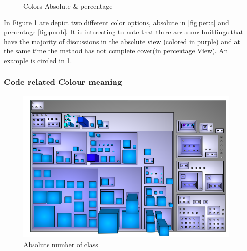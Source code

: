 \documentclass[]{usiinfbachelorproject}
\begin{document}
\begin{figure}[h]
\centering
{}
\hspace*{\fill}

\caption{Colors Absolute \& percentage}
\label{fig:per}
\end{figure}
In Figure \ref{fig:per} are depict two different color options, absolute in \ref{fig:per:a} and percentage \ref{fig:per:b}.
It is interesting to note that there are some buildings that have the majority of discussions in the absolute view (colored in purple) and at the same time the method has not complete cover(in percentage View). An example is circled in \ref{fig:per}.
\newpage

\subsubsection{Code related Colour meaning}
\begin{figure}
\centering
\includegraphics[width=.30\textwidth]{images/classAbs}
\caption{Absolute number of class \label{fig:classAbs}
}
\end{figure}
\end{document}
